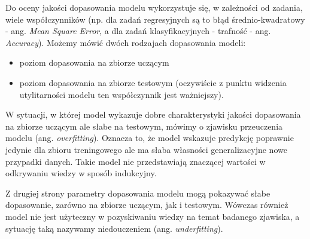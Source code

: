 \documentclass[
]{book}
\providecommand{\tightlist}{%
  \setlength{\itemsep}{0pt}\setlength{\parskip}{0pt}}
\theoremstyle{plain}
\theoremstyle{definition}
\theoremstyle{definition}
\theoremstyle{definition}
\theoremstyle{definition}
\theoremstyle{remark}
\begin{document}
Do oceny jakości dopasowania modelu wykorzystuje się, w zależności od zadania, wiele współczynników (np. dla zadań regresyjnych są to błąd średnio-kwadratowy - ang. \emph{Mean Square Error}, a dla zadań klasyfikacyjnych - trafność - ang. \emph{Accuracy}). Możemy mówić dwóch rodzajach dopasowania modeli:

\begin{itemize}
\tightlist
\item
  poziom dopasowania na zbiorze uczącym
\item
  poziom dopasowania na zbiorze testowym (oczywiście z punktu widzenia utylitarności modelu ten współczynnik jest ważniejszy).
\end{itemize}

W sytuacji, w której model wykazuje dobre charakterystyki jakości dopasowania na zbiorze uczącym ale słabe na testowym, mówimy o zjawisku przeuczenia modelu (ang. \emph{overfitting}). Oznacza to, że model wskazuje predykcję poprawnie jedynie dla zbioru treningowego ale ma słaba własności generalizacyjne nowe przypadki danych. Takie model nie przedstawiają znaczącej wartości w odkrywaniu wiedzy w sposób indukcyjny.

Z drugiej strony parametry dopasowania modelu mogą pokazywać słabe dopasowanie, zarówno na zbiorze uczącym, jak i testowym. Wówczas również model nie jest użyteczny w pozyskiwaniu wiedzy na temat badanego zjawiska, a sytuację taką nazywamy niedouczeniem (ang. \emph{underfitting}).
\end{document}
